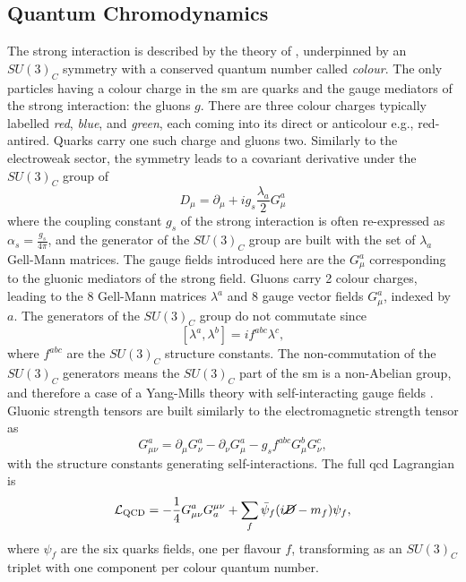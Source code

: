 \subsection{Quantum Chromodynamics}
The strong interaction is described by the theory of \textit{}, underpinned by an $SU(3)_C$ symmetry with a conserved quantum number called \textit{colour}. The only particles having a colour charge in the \gls{sm} are quarks and the gauge mediators of the strong interaction: the gluons $g$. There are three colour charges typically labelled \textit{red}, \textit{blue}, and \textit{green}, each coming into its direct or anticolour e.g., red-antired. Quarks carry one such charge and gluons two. Similarly to the electroweak sector, the symmetry leads to a covariant derivative under the $SU(3)_C$ group of
\begin{equation}\label{eq-GaugeQCD}
    D_{\mu}  = \partial_{\mu} + ig_s \frac{\lambda_a}{2} G_{\mu}^a
\end{equation}
where the coupling constant $g_s$ of the strong interaction is often re-expressed as $\alpha_s = \frac{g_s}{4\pi}$, and the generator of the $SU(3)_C$ group are built with the set of $\lambda_a$ Gell-Mann matrices. The gauge fields introduced here are the $G_{\mu}^a$ corresponding to the gluonic mediators of the strong field. Gluons carry 2 colour charges, leading to the 8 Gell-Mann matrices $\lambda^a$ and 8 gauge vector fields $G_{\mu}^a$, indexed by $a$. The generators of the $SU(3)_C$ group do not commutate since \[ [\lambda^a, \lambda^b] = i f^{abc} \lambda^c,\] where $f^{abc}$ are the $SU(3)_C$ structure constants. The non-commutation of the $SU(3)_C$ generators means the $SU(3)_C$ part of the \gls{sm} is a non-Abelian group, and therefore a case of a Yang-Mills theory with self-interacting gauge fields \cite{PhysRev.96.191}. Gluonic strength tensors are built similarly to the electromagnetic strength tensor as \[G_{\mu\nu}^a = \partial_{\mu} G_{\nu}^a   - \partial_{\nu} G_{\mu}^a - g_s f^{abc} G_{\mu}^b G_{\nu}^c,\] with the structure constants generating self-interactions. The full \gls{qcd} Lagrangian is
\begin{equation}\label{eq-QCDLag}
    \mathcal{L}_{\text{QCD}} = -\frac{1}{4} G_{\mu\nu}^a G^{\mu\nu}_a + \sum_{f} \bar{\psi}_f (i \cancel{D} - m_f) \psi_f,
\end{equation}
where $\psi_f$ are the six quarks fields, one per flavour $f$, transforming as an $SU(3)_C$ triplet with one component per colour quantum number. \\

